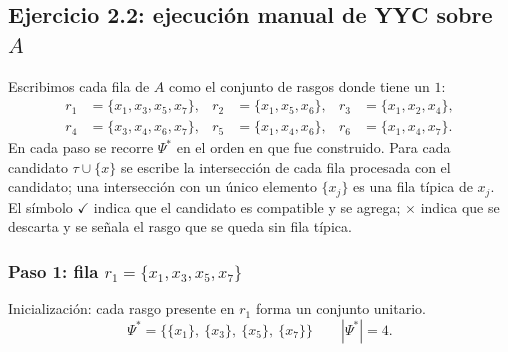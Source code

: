 \documentclass[11pt, a4paper]{article}
\theoremstyle{definition}
\theoremstyle{plain}
\newcommand{\Psis}{\Psi^{*}}
\newcommand{\x}[1]{x_{#1}}
\newcommand{\cj}[1]{\{#1\}}
\newcommand{\si}{\textcolor{green!50!black}{\ensuremath{\checkmark}}}
\newcommand{\no}{\textcolor{red!70!black}{\ensuremath{\times}}}
\begin{document}
\subsection{Ejercicio 2.2: ejecución manual de YYC sobre $A$}\label{sec:yyc-manual}

Escribimos cada fila de $A$ como el conjunto de rasgos donde tiene un $1$:
\[
\begin{aligned}
r_1&=\cj{\x1,\x3,\x5,\x7}, & r_2&=\cj{\x1,\x5,\x6}, & r_3&=\cj{\x1,\x2,\x4},\\
r_4&=\cj{\x3,\x4,\x6,\x7}, & r_5&=\cj{\x1,\x4,\x6}, & r_6&=\cj{\x1,\x4,\x7}.
\end{aligned}
\]
En cada paso se recorre $\Psis$ en el orden en que fue construido. Para cada
candidato $\tau\cup\{x\}$ se escribe la intersección de cada fila procesada con el
candidato; una intersección con un único elemento $\cj{\x j}$ es una fila
típica de $\x j$. El símbolo \si{} indica que el candidato es compatible y se
agrega; \no{} indica que se descarta y se señala el rasgo que se queda sin
fila típica.

\subsubsection*{Paso 1: fila $r_1=\cj{\x1,\x3,\x5,\x7}$}
Inicialización: cada rasgo presente en $r_1$ forma un conjunto unitario.
\[
\Psis=\big\{\cj{\x1},\ \cj{\x3},\ \cj{\x5},\ \cj{\x7}\big\}\qquad |\Psis|=4.
\]
\end{document}
